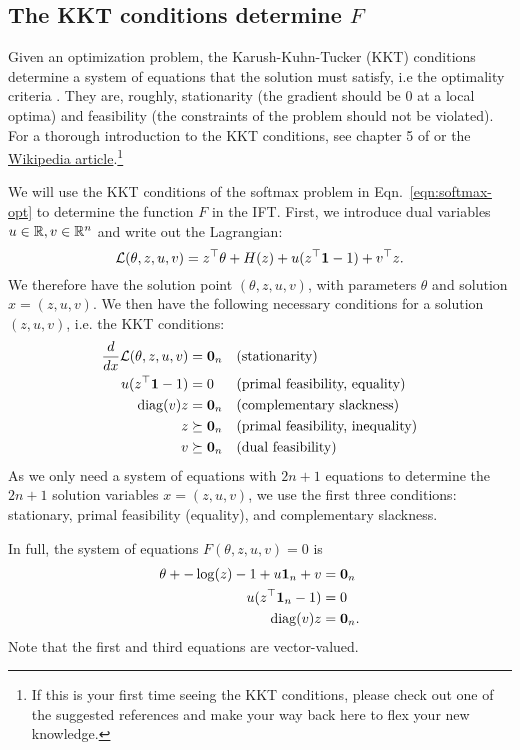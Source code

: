 \documentclass[11pt]{article}
\begin{document}
\subsection{The KKT conditions determine $F$}
Given an optimization problem, the Karush-Kuhn-Tucker (KKT) conditions
determine a system of equations that the solution must satisfy,
i.e the optimality criteria \citep{kkt-thesis,kkt}.
They are, roughly, stationarity (the gradient should be 0 at a local optima)
and feasibility (the constraints of the problem should not be violated).
For a thorough introduction to the KKT conditions, see chapter 5 of \citet{bv-cvxbook}
or the \href{https://en.wikipedia.org/wiki/Karush-Kuhn-Tucker\_conditions}{Wikipedia article}.\footnote{
If this is your first time seeing the KKT conditions, please check out
one of the suggested references
and make your way back here to flex your new knowledge.
}

We will use the KKT conditions of the softmax problem in
Eqn.~\ref{eqn:softmax-opt} to determine the function $F$ in the IFT.
First, we introduce dual variables $u\in\mathbb{R},v\in\mathbb{R}^n$ and write out the Lagrangian:
$$\mathcal{L}(\theta, z, u, v) = z^\top\theta + H(z) + u(z^\top \mathbf{1} - 1) + v^\top z.$$
We therefore have the solution point $(\theta,z,u,v)$, with parameters $\theta$
and solution $x=(z,u,v)$.
We then have the following necessary conditions for a solution $(z,u,v)$,
i.e. the KKT conditions:
\begin{equation}
\begin{aligned}
\frac{d}{dx} \mathcal{L}(\theta, z,u,v) &= \mathbf{0}_n && \textrm{(stationarity)}\\
u(z^{\top} \mathbf{1} - 1) &= 0 && \textrm{(primal feasibility, equality)}\\
\mathrm{diag}(v)z &= \mathbf{0}_{n} && \textrm{(complementary slackness)}\\
z &\succeq \mathbf{0}_n && \textrm{(primal feasibility, inequality)}\\
v &\succeq \mathbf{0}_n && \textrm{(dual feasibility)}
\end{aligned}
\end{equation}
As we only need a system of equations with $2n+1$ equations to
determine the $2n+1$ solution variables $x=(z,u,v)$,
we use the first three conditions: stationary, primal feasibility (equality),
and complementary slackness.

In full, the system of equations $F(\theta, z,u,v) = 0$ is
\begin{equation}
\label{eqn:system}
\begin{aligned}
\theta + -\log(z) - 1 + u\mathbf{1}_n + v &= \mathbf{0}_n\\
u(z^{\top} \mathbf{1}_n - 1) &= 0\\
\mathrm{diag}(v)z &= \mathbf{0}_n.
\end{aligned}
\end{equation}
Note that the first and third equations are vector-valued.
\end{document}
